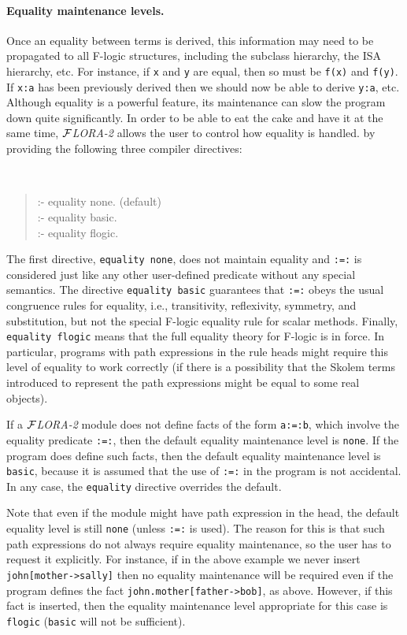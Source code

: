 \documentclass[11pt]{article}
\newcommand{\FLORA}{{\mbox{${\cal F}${\small\it LORA}\rm\emph{-2}}}\xspace}
\newcommand{\fl}{\mbox{F-logic}\xspace}
\begin{document}
\paragraph{Equality maintenance levels.}
Once an equality between terms is derived, this information may need to be
propagated to all \fl 
structures, including the subclass hierarchy, the ISA hierarchy, etc.
For instance, if {\tt x} and {\tt y} are equal, then so must be {\tt f(x)}
and {\tt f(y)}. If {\tt x:a} has been previously derived then we should now
be able to derive {\tt y:a}, etc. Although equality is a powerful
feature, its maintenance can slow the program down quite significantly.
In order to be able to eat the cake and have it at the same time, \FLORA
allows the user to control how equality is handled.
by providing the following three compiler directives:
{\tt
\begin{quote}
:- equality none.  (default)\\
:- equality basic.\\
:- equality flogic.
\end{quote}
}

\noindent
The first directive, \mbox{\tt equality none}, does not maintain equality
and {\tt :=:} is considered just like any other user-defined predicate
without any special semantics.  The directive \mbox{\tt equality basic}
guarantees that {\tt :=:} obeys the usual congruence rules for equality,
i.e., transitivity, reflexivity, symmetry, and substitution, but not the
special \fl equality rule for scalar methods. Finally, \mbox{\tt equality
  flogic} means that the full equality theory for \fl is in force.  In
particular, programs with path expressions in the rule heads might require
this level of equality to work correctly (if there is a possibility that
the Skolem terms introduced to represent the path expressions might be
equal to some real objects).

If a \FLORA module does not define facts of the form {\tt a:=:b}, which
involve the equality predicate {\tt :=:}, then the default equality
maintenance level is {\tt none}. If the program does define such facts,
then the default equality maintenance level is {\tt basic}, because it is
assumed that the use of {\tt :=:} in the program is not accidental.
In any case, the {\tt equality} directive overrides the default.

Note that even if the module might have path expression in the head, the
default equality level is still {\tt none} (unless {\tt :=:} is used).  The
reason for this is that such path expressions do not always require
equality maintenance, so the user has to request it explicitly.  For
instance, if in the above example we never insert
\verb|john[mother->sally]| then no equality maintenance will be required
even if the program defines the fact {\tt john.mother[father->bob]}, as
above.  However, if this fact is inserted, then the equality maintenance
level appropriate for this case is {\tt flogic} ({\tt basic} will not be
sufficient).
\end{document}
